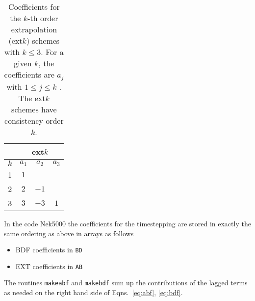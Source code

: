 \begin{table}[tb!]
\caption[{\sc ext}$k$ Coefficients]
{Coefficients for the $k$-th order extrapolation ({\sc ext}$k$) schemes 
with $k \leq 3$. For a given $k$, the coefficients are $a_j$ with $1 \leq j \leq k$ . The {\sc ext}$k$ schemes have consistency order $k$.} 
\label{tab:bdms}
\begin{center}
\begin{tabular}{|c||c|c|c|}  \hline\hline 
  & \multicolumn{3}{c|}{{\sc ext}$k$} \\ \hline\hline  
  $k$ &  $a_1$ & $a_2$ & $a_3$   \\ \hline
  1   &  $1$ &  &                \\ \hline
  2  & $ 2$ & $  -1$ &         \\ \hline
  3  & $3$ & $ -3$ & $1$    \\ \hline\hline
\end{tabular}
\end{center}
\end{table}

In the code Nek5000 the coefficients for the timestepping are stored in exactly the same ordering as above in arrays as follows
\begin{itemize}
\item BDF coefficients in {\tt BD}
\item EXT coefficients in {\tt AB}
\end{itemize}

The routines {\tt makeabf} and {\tt makebdf} sum up the contributions of the lagged terms as needed on the right hand side of Eqns.~\ref{eq:abf}, \ref{eq:bdf}.